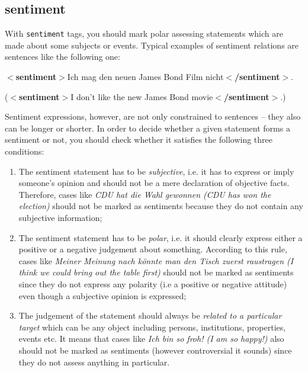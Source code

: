 \documentclass[11pt,a4paper]{article}
\newcommand{\xmltag}[1]{{\textbf{\small$<$#1$>$}}}
\newcommand{\sentiment}[1]{\xmltag{sentiment}#1\xmltag{/sentiment}}
\newenvironment{myexe}{
  \begin{exe}
    \ex\begin{center}
    \itshape
}{
    \end{center}
  \end{exe}
}
\begin{document}
\subsection{sentiment}\label{sec:sentiment}
With \texttt{sentiment} tags, you should mark polar assessing statements which
are made about some subjects or events.  Typical examples of sentiment
relations are sentences like the following one:
\begin{myexe}
  \sentiment{Ich mag den neuen James Bond Film nicht}.

  (\sentiment{I don't like the new James Bond
    movie}.)\label{ex:sentiment}
\end{myexe}
Sentiment expressions, however, are not only constrained to sentences -- they
also can be longer or shorter. In order to decide whether a
given statement forms a sentiment or not, you should check whether it
satisfies the following three conditions:
\begin{enumerate}
  \item The sentiment statement has to be \textit{subjective}, i.e. it has to
    express or imply someone's opinion and should not be a mere declaration of
    objective facts.  Therefore, cases like \textit{CDU hat die Wahl gewonnen
      (CDU has won the election)} should not be marked as sentiments because
    they do not contain any subjective information;

  \item The sentiment statement has to be \textit{polar}, i.e. it should
    clearly express either a positive or a negative judgement about
    something.  According to this rule, cases like \textit{Meiner Meinung nach
      k\"onnte man den Tisch zuerst raustragen (I think we could bring out the
      table first)} should not be marked as sentiments since they do not
    express any polarity (i.e a positive or negative attitude) even though 
	a subjective opinion is expressed;

  \item The judgement of the statement should always be \textit{related to a
    particular target} which can be any object including persons,
    institutions, properties, events etc.  It means that cases like
    \textit{Ich bin so froh! (I am so happy!)} also should not be marked as
    sentiments (however controversial it sounds) since they do not assess
    anything in particular.
\end{enumerate}
\end{document}
